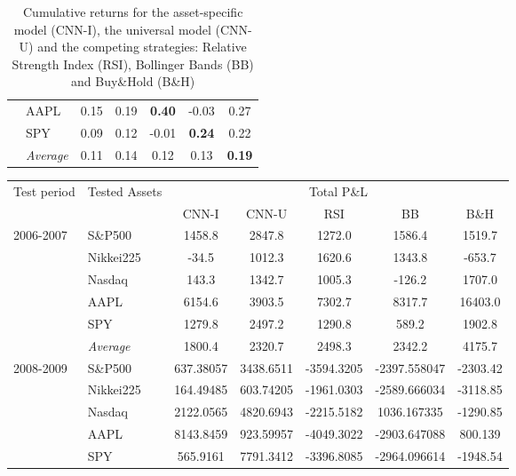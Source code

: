\documentclass[11pt, a4paper]{article}
\begin{document}
\begin{table}[H]
\begin{tabular}{l|l|ccccc}
  & AAPL             & 0.15              & 0.19          & \textbf{0.40} & -0.03         & 0.27          \\
  & SPY              & 0.09              & 0.12          & -0.01         & \textbf{0.24} & 0.22          \\ \cline{2-7}
  & \textit{Average} & 0.11              & 0.14          & 0.12          & 0.13          & \textbf{0.19}
\end{tabular}
\caption{Cumulative returns for the asset-specific model (CNN-I), the universal model (CNN-U) and the competing strategies: Relative Strength Index (RSI), Bollinger Bands (BB) and Buy\&Hold (B\&H)}
\label{tbl:Cummulative}
\end{table}

\begin{table}[H]
\centering
\begin{tabular}{l|l|ccccc}
        \multicolumn{1}{m{1cm}|}{\multirow{2}{1cm}{Test period}} & \multicolumn{1}{m{1.5cm}|}{\multirow{2}{1.5cm}{Tested Assets}} &       \multicolumn{5}{c}{Total P\&L}  \\ \cline{3-7}
          &           & CNN-I   & CNN-U   & RSI     & BB      & B\&H    \\
          \hline \hline
\multirow{6}{1cm}{2006-2007} & S\&P500   & 1458.8  & 2847.8  & 1272.0  & 1586.4  & 1519.7    \\
          & Nikkei225 & -34.5   & 1012.3  & 1620.6  & 1343.8  & -653.7   \\
          & Nasdaq    & 143.3   & 1342.7  & 1005.3  & -126.2  & 1707.0 \\
          & AAPL      & 6154.6  & 3903.5  & 7302.7  & 8317.7  & 16403.0  \\
          & SPY       & 1279.8  & 2497.2  & 1290.8  & 589.2   & 1902.8 \\
          \cline{2-7}
          & \textit{Average}   & 1800.4  & 2320.7  & 2498.3  & 2342.2  & 4175.7 \\
          \hline
\multirow{6}{1cm}{2008-2009}& S\&P500          & 637.38057 & 3438.6511 & -3594.3205 & -2397.558047 & -2303.42 \\
 & Nikkei225        & 164.49485 & 603.74205 & -1961.0303 & -2589.666034 & -3118.85 \\
 & Nasdaq           & 2122.0565 & 4820.6943 & -2215.5182 & 1036.167335  & -1290.85 \\
 & AAPL             & 8143.8459 & 923.59957 & -4049.3022 & -2903.647088 & 800.139  \\
 & SPY              & 565.9161  & 7791.3412 & -3396.8085 & -2964.096614 & -1948.54 \\ \cline{2-7} 

\end{tabular}
\end{table}
\end{document}
